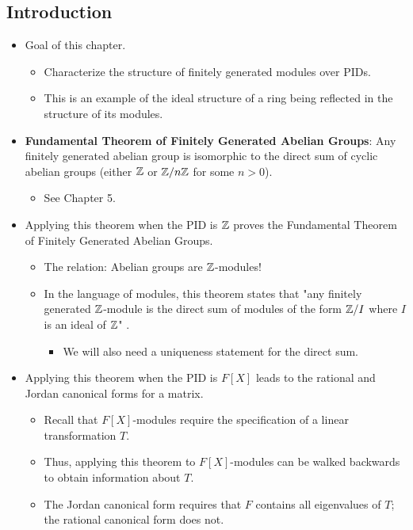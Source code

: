 \documentclass[../notes.tex]{subfiles}
\begin{document}
\subsection*{Introduction}
\begin{itemize}
    \item Goal of this chapter.
    \begin{itemize}
        \item Characterize the structure of finitely generated modules over PIDs.
        \item This is an example of the ideal structure of a ring being reflected in the structure of its modules.
    \end{itemize}
    \item \textbf{Fundamental Theorem of Finitely Generated Abelian Groups}: Any finitely generated abelian group is isomorphic to the direct sum of cyclic abelian groups (either $\mathbb{Z}$ or $\mathbb{Z}/n\mathbb{Z}$ for some $n>0$).
    \begin{itemize}
        \item See Chapter 5.
    \end{itemize}
    \item Applying this theorem when the PID is $\mathbb{Z}$ proves the Fundamental Theorem of Finitely Generated Abelian Groups.
    \begin{itemize}
        \item The relation: Abelian groups are $\mathbb{Z}$-modules!
        \item In the language of modules, this theorem states that "any finitely generated $\mathbb{Z}$-module is the direct sum of modules of the form $\mathbb{Z}/I$ where $I$ is an ideal of $\mathbb{Z}$" \parencite[456]{bib:DummitFoote}.
        \begin{itemize}
            \item We will also need a uniqueness statement for the direct sum.
        \end{itemize}
    \end{itemize}
    \item Applying this theorem when the PID is $F[X]$ leads to the rational and Jordan canonical forms for a matrix.
    \begin{itemize}
        \item Recall that $F[X]$-modules require the specification of a linear transformation $T$.
        \item Thus, applying this theorem to $F[X]$-modules can be walked backwards to obtain information about $T$.
        \item The Jordan canonical form requires that $F$ contains all eigenvalues of $T$; the rational canonical form does not.

\end{itemize}
\end{itemize}
\end{document}

